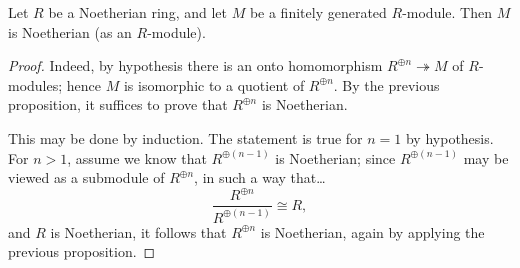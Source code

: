 \begin{corollary}
Let $R$ be a Noetherian ring, and let $M$ be a finitely generated $R$-module. Then $M$ is Noetherian (as an $R$-module).
\end{corollary}

\begin{proof}
Indeed, by hypothesis there is an onto homomorphism $R^{\oplus n} \twoheadrightarrow M$ of $R$-modules; hence $M$ is isomorphic
to a quotient of $R^{\oplus n}$. By the previous proposition, it suffices to prove that $R^{\oplus n}$ is Noetherian.

This may be done by induction. The statement is true for $n = 1$ by hypothesis. For $n > 1$, assume we know that $R^{\oplus(n-1)}$ is Noetherian;
since $R^{\oplus(n-1)}$ may be viewed as a submodule of $R^{\oplus n}$, in such a way that\dots
$$\frac{R^{\oplus n}}{R^{\oplus(n-1)}} \cong R,$$
and $R$ is Noetherian, it follows that $R^{\oplus n}$ is Noetherian, again by applying the previous proposition.
\end{proof}